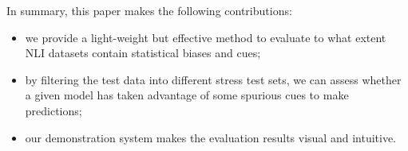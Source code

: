 In summary, this paper makes the following contributions:
\begin{itemize}
\item we provide a light-weight but effective method to evaluate to what extent 
NLI datasets contain statistical biases and cues;

\item by filtering the test data into different stress test sets, 
we can assess whether a given model has taken advantage of some
spurious cues to make predictions;

\item our demonstration system makes the evaluation results visual and intuitive.
\end{itemize}


















